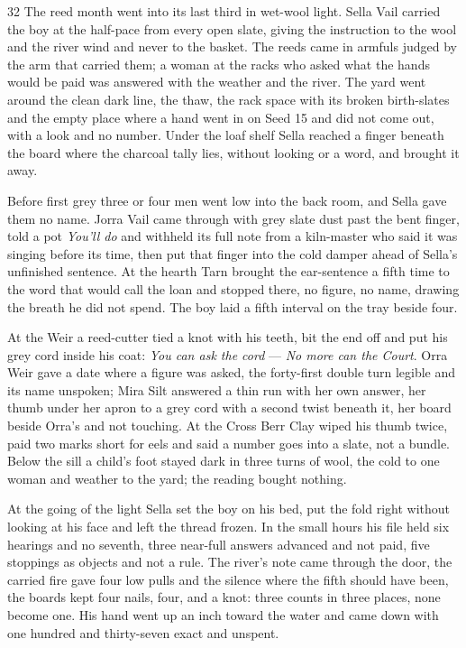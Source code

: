 \begin{CRchronicle}{32}
The reed month went into its last third in wet-wool light. Sella Vail carried the boy at the half-pace from every open slate, giving the instruction to the wool and the river wind and never to the basket. The reeds came in armfuls judged by the arm that carried them; a woman at the racks who asked what the hands would be paid was answered with the weather and the river. The yard went around the clean dark line, the thaw, the rack space with its broken birth-slates and the empty place where a hand went in on Seed 15 and did not come out, with a look and no number. Under the loaf shelf Sella reached a finger beneath the board where the charcoal tally lies, without looking or a word, and brought it away.

Before first grey three or four men went low into the back room, and Sella gave them no name. Jorra Vail came through with grey slate dust past the bent finger, told a pot \emph{You’ll do} and withheld its full note from a kiln-master who said it was singing before its time, then put that finger into the cold damper ahead of Sella’s unfinished sentence. At the hearth Tarn brought the ear-sentence a fifth time to the word that would call the loan and stopped there, no figure, no name, drawing the breath he did not spend. The boy laid a fifth interval on the tray beside four.

At the Weir a reed-cutter tied a knot with his teeth, bit the end off and put his grey cord inside his coat: \emph{You can ask the cord} --- \emph{No more can the Court}. Orra Weir gave a date where a figure was asked, the forty-first double turn legible and its name unspoken; Mira Silt answered a thin run with her own answer, her thumb under her apron to a grey cord with a second twist beneath it, her board beside Orra’s and not touching. At the Cross Berr Clay wiped his thumb twice, paid two marks short for eels and said a number goes into a slate, not a bundle. Below the sill a child’s foot stayed dark in three turns of wool, the cold to one woman and weather to the yard; the reading bought nothing.

At the going of the light Sella set the boy on his bed, put the fold right without looking at his face and left the thread frozen. In the small hours his file held six hearings and no seventh, three near-full answers advanced and not paid, five stoppings as objects and not a rule. The river’s note came through the door, the carried fire gave four low pulls and the silence where the fifth should have been, the boards kept four nails, four, and a knot: three counts in three places, none become one. His hand went up an inch toward the water and came down with one hundred and thirty-seven exact and unspent.
\end{CRchronicle}
